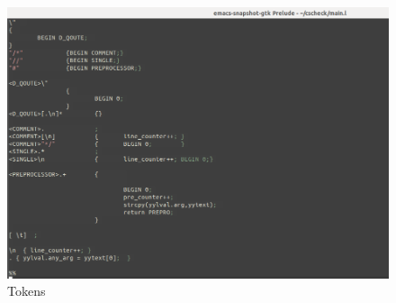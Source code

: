 \begin{figure}[H]
\centering
\includegraphics[scale=0.4]{Snaps/main_l_2.png}
\caption{Tokens}
\label{<<Label>>}
\end{figure}


